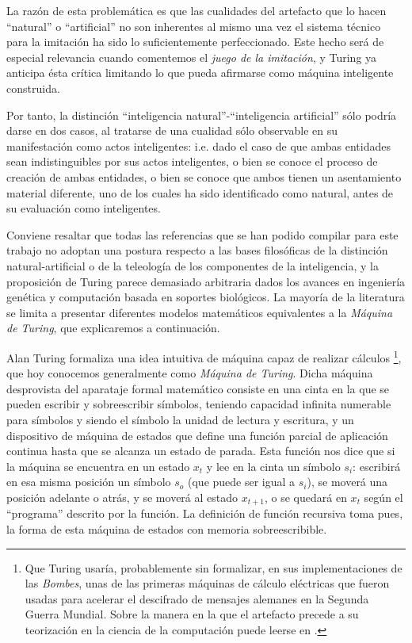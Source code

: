 \documentclass[12pt]{memoir}
\begin{document}
La razón de esta problemática es que las cualidades del artefacto que lo hacen ``natural'' o ``artificial'' no son inherentes al mismo una vez el sistema técnico para la imitación ha sido lo suficientemente perfeccionado. Este hecho será de especial relevancia cuando comentemos el \textit{juego de la imitación}, y Turing ya anticipa ésta crítica limitando lo que pueda afirmarse como máquina inteligente construida.

Por tanto, la distinción ``inteligencia natural''-``inteligencia artificial'' sólo podría darse en dos casos, al tratarse de una cualidad sólo observable en su manifestación como actos inteligentes: i.e. dado el caso de que ambas entidades sean indistinguibles por sus actos inteligentes, o bien se conoce el proceso de creación de ambas entidades, o bien se conoce que ambos tienen un asentamiento material diferente, uno de los cuales ha sido identificado como natural, antes de su evaluación como inteligentes.

Conviene resaltar que todas las referencias que se han podido compilar para este trabajo no adoptan una postura respecto a las bases filosóficas de la distinción natural-artificial o de la teleología de los componentes de la inteligencia, y la proposición de Turing parece demasiado arbitraria dados los avances en ingeniería genética y computación basada en soportes biológicos. La mayoría de la literatura se limita a presentar diferentes modelos matemáticos equivalentes a la \textit{Máquina de Turing}, que explicaremos a continuación.

Alan Turing formaliza \parencite{turingComputableNumbers} una idea intuitiva de máquina capaz de realizar cálculos \footnote{Que Turing usaría, probablemente sin formalizar, en sus implementaciones de las \textit{Bombes}, unas de las primeras máquinas de cálculo eléctricas que fueron usadas para acelerar el descifrado de mensajes alemanes en la Segunda Guerra Mundial. Sobre la manera en la que el artefacto precede a su teorización en la ciencia de la computación puede leerse en \parencite[apartado 1]{alonso}.}, que hoy conocemos generalmente como \textit{Máquina de Turing}. Dicha máquina desprovista del aparataje formal matemático consiste en una cinta en la que se pueden escribir y sobreescribir símbolos, teniendo capacidad infinita numerable para símbolos y siendo el símbolo la unidad de lectura y escritura, y un dispositivo de máquina de estados que define una función parcial de aplicación continua hasta que se alcanza un estado de parada. Esta función nos dice que si la máquina se encuentra en un estado $x_{t}$ y lee en la cinta un símbolo $s_i$: escribirá en esa misma posición un símbolo $s_o$ (que puede ser igual a $s_i$), se moverá una posición adelante o atrás, y se moverá al estado $x_{t+1}$, o se quedará en $x_{t}$ según el ``programa'' descrito por la función. La definición de función recursiva toma pues, la forma de esta máquina de estados con memoria sobreescribible. 
\end{document}
